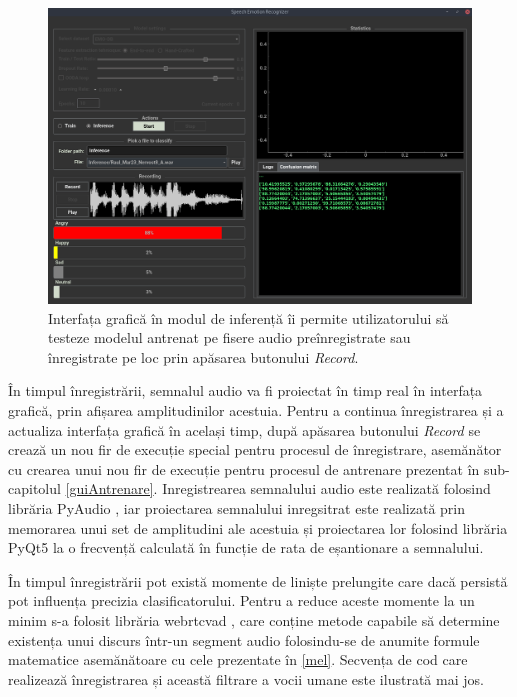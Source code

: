 \documentclass[a4paper,12pt]{book}
\begin{document}
		\begin{figure}[h]
			\hspace{-0.3cm}
			\includegraphics[scale=0.35]{gui_inf}
			\caption{Interfața grafică în modul de inferență îi permite utilizatorului să testeze modelul antrenat pe fisere audio preînregistrate sau înregistrate pe loc prin apăsarea butonului \textit{Record}.}
			\label{fig:gui_inf}
		\end{figure} 
		În timpul înregistrării, semnalul audio va fi proiectat în timp real în interfața grafică, prin afișarea amplitudinilor acestuia. Pentru a continua înregistrarea și a actualiza interfața grafică în același timp, după apăsarea butonului \textit{Record} se crează un nou fir de execuție special pentru procesul de înregistrare, asemănător cu crearea unui nou fir de execuție pentru procesul de antrenare prezentat în sub-capitolul \ref{guiAntrenare}. Inregistrearea semnalului audio este realizată folosind librăria PyAudio \cite{pyaudio}, iar proiectarea semnalului inregsitrat este realizată prin memorarea unui set de amplitudini ale acestuia și proiectarea lor folosind librăria PyQt5 la o frecvență calculată în funcție de rata de eșantionare a semnalului. \par
		În timpul înregistrării pot există momente de liniște prelungite care dacă persistă pot influența precizia clasificatorului. Pentru a reduce aceste momente la un minim s-a folosit librăria webrtcvad \cite{vad}, care conține metode capabile să determine existența unui discurs într-un segment audio folosindu-se de anumite formule matematice asemănătoare cu cele prezentate în \ref{mel}. Secvența de cod care realizează înregistrarea și această filtrare a vocii umane este ilustrată mai jos.
\end{document}
